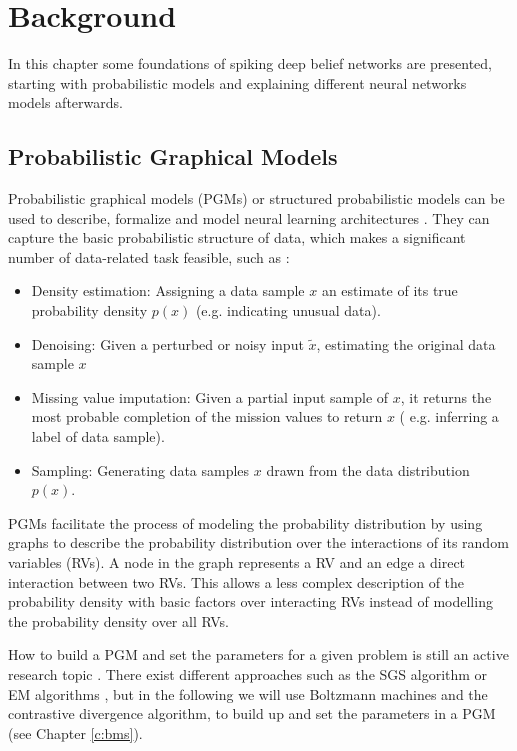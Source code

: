 \chapter{Background} \label{c:backgrnd}

In this chapter some foundations of spiking deep belief networks are presented, starting with probabilistic models and explaining different neural networks models afterwards.

\section{Probabilistic Graphical Models} \label{c:pgms}

Probabilistic graphical models (PGMs) or structured probabilistic models can be used to describe, formalize and model neural learning architectures \cite{Goodfellow-et-al-2016-Book} \cite{Petrovici2016}.
They can capture the basic probabilistic structure of data, which makes a significant number of data-related task feasible, such as \cite{Goodfellow-et-al-2016-Book}:
\begin{itemize}

\item Density estimation: Assigning a data sample $x$ an estimate of its true probability density $p(x)$ (e.g. indicating unusual data).

\item Denoising: Given a perturbed or noisy input $\widetilde{x}$,  estimating the original data sample $x$

\item Missing value imputation: Given a partial input sample of $x$, it returns the most probable completion of the mission values to return $x$ ( e.g. inferring a label of data sample).

\item Sampling: Generating data samples $x$ drawn from the data distribution $p(x)$. 

\end{itemize}  

PGMs facilitate the process of modeling the probability distribution by using graphs to describe the probability distribution over the interactions of its random variables (RVs).
A node in the graph represents a RV and an edge a direct interaction between two RVs.
This allows a less complex description of the probability density with basic factors over interacting RVs instead of modelling the probability density over all RVs. 

How to build a PGM and set the parameters for a given problem is still an active research topic \cite{Ghahramani2002}\cite{Zhou2007}.
There exist different approaches such as the SGS algorithm \cite{Zhou2007} or EM algorithms \cite{Ghahramani2002}, but in the following we will use Boltzmann machines and the contrastive divergence algorithm, to build up and set the parameters in a PGM (see Chapter \ref{c:bms}).

